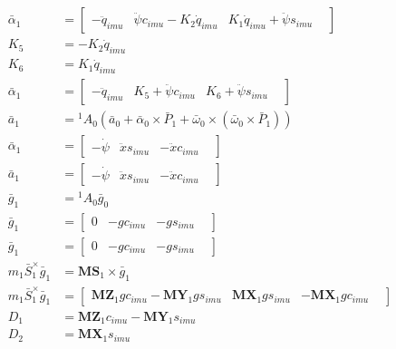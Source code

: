 \begin{align}
 \nonumber \\ 
 \bar\alpha_{1} &= \left[\begin{matrix} -\ddot{q}_{imu} & \ddot{\psi}c_{imu} - K_{2}\dot{q}_{imu} & K_{1}\dot{q}_{imu} + \ddot{\psi}s_{imu} &  \end{matrix}\right] 
 \nonumber \\ 
K_{5} &= -K_{2}\dot{q}_{imu} \nonumber \\
K_{6} &= K_{1}\dot{q}_{imu} \nonumber \\
 \bar\alpha_{1} &= \left[\begin{matrix} -\ddot{q}_{imu} & K_{5} + \ddot{\psi}c_{imu} & K_{6} + \ddot{\psi}s_{imu} &  \end{matrix}\right] 
 \nonumber \\ 
 \bar{a}_{1} &= {}^{1}A_{0} \left(\bar{a}_{0} + \bar\alpha_{0} \times \bar{P}_{1} + \bar\omega_{0} \times \left(\bar\omega_{0} \times \bar{P}_{1}\right)\right) 
 \nonumber \\ 
 \bar\alpha_{1} &= \left[\begin{matrix} -\dot{\psi} & \ddot{x}s_{imu} & -\ddot{x}c_{imu} &  \end{matrix}\right] 
 \nonumber \\ 
 \bar{a}_{1} &= \left[\begin{matrix} -\dot{\psi} & \ddot{x}s_{imu} & -\ddot{x}c_{imu} &  \end{matrix}\right] 
 \nonumber \\ 
 \bar{g}_{1} &= {}^{1}A_{0} \bar{g}_{0} 
 \nonumber \\ 
 \bar{g}_{1} &= \left[\begin{matrix} 0 & -gc_{imu} & -gs_{imu} &  \end{matrix}\right] 
 \nonumber \\ 
 \bar{g}_{1} &= \left[\begin{matrix} 0 & -gc_{imu} & -gs_{imu} &  \end{matrix}\right] 
 \nonumber \\ 
 m_{1}\bar{S}_{1}^{\times}\bar{g}_{1} &= \mathbf{MS}_{1} \times \bar{g}_{1} 
 \nonumber \\ 
 m_{1}\bar{S}_{1}^{\times}\bar{g}_{1} &= \left[\begin{matrix} \mathbf{MZ}_1gc_{imu} - \mathbf{MY}_1gs_{imu} & \mathbf{MX}_1gs_{imu} & -\mathbf{MX}_1gc_{imu} &  \end{matrix}\right] 
 \nonumber \\ 
D_{1} &= \mathbf{MZ}_1c_{imu} - \mathbf{MY}_1s_{imu} \nonumber \\
D_{2} &= \mathbf{MX}_1s_{imu} \nonumber \\

\end{align}
